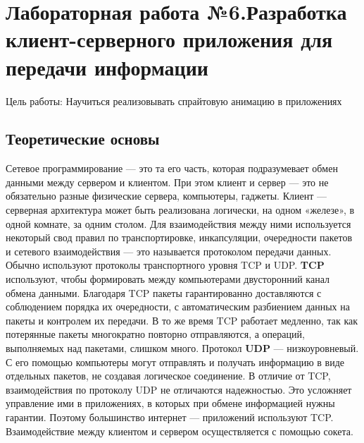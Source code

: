 \documentclass[a4paper]{article}
\begin{document}
\newpage
\section{Лабораторная работа №6.\newline Разработка клиент-серверного приложения для передачи информации}

Цель работы: Научиться реализовывать спрайтовую анимацию в приложениях

\subsection{Теоретические основы}

Сетевое программирование --- это та его часть, которая подразумевает обмен данными между сервером и клиентом. При этом клиент и сервер --- это не обязательно разные физические сервера, компьютеры, гаджеты. Клиент --- серверная архитектура может быть реализована логически, на одном «железе», в одной комнате, за одним столом. Для взаимодействия между ними используется некоторый свод правил по транспортировке, инкапсуляции, очередности пакетов и сетевого взаимодействия --- это называется протоколом передачи данных. Обычно используют протоколы транспортного уровня TCP и UDP. \textbf{TCP} используют, чтобы формировать между компьютерами двусторонний канал обмена данными. Благодаря TCP пакеты гарантированно доставляются с соблюдением порядка их очередности, с автоматическим разбиением данных на пакеты и контролем их передачи. В то же время TCP работает медленно, так как потерянные пакеты многократно повторно отправляются, а операций, выполняемых над пакетами, слишком много. Протокол \textbf{UDP} --- низкоуровневый. С его помощью компьютеры могут отправлять и получать информацию в виде отдельных пакетов, не создавая логическое соединение. В отличие от TCP, взаимодействия по протоколу UDP не отличаются надежностью. Это усложняет управление ими в приложениях, в которых при обмене информацией нужны гарантии. Поэтому большинство интернет --- приложений используют TCP. Взаимодействие между клиентом и сервером осуществляется с помощью сокета.
\end{document}
